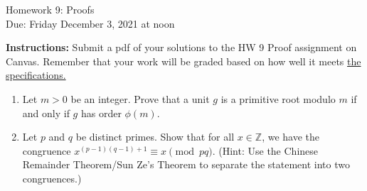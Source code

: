 \documentclass[10pt,a4paper]{article}
\begin{document}
\begin{center}
{\Large Homework 9: Proofs}\\
Due: Friday December 3, 2021 at noon\\


\end{center}
{\bf Instructions:} Submit a pdf of your solutions to the HW 9 Proof assignment on Canvas. Remember that your work will be graded based on how well it meets \href{https://docs.google.com/document/d/1emM06_WRh_h941rsjtRE9fRVndJtfRKd9gyS3Fs_rFA/edit?usp=sharing}{the specifications. }

\begin{enumerate}
\item Let $m>0$ be an integer. Prove that a unit $g$ is a primitive root modulo $m$ if and only if $g$ has order $\phi(m)$. 
\item Let $p$ and $q$ be distinct primes.  Show that for all $x \in \mathbb{Z}$, we have the congruence $x^{(p-1)(q-1)+1} \equiv x \pmod{pq}$.   (Hint: Use the Chinese Remainder Theorem/Sun Ze's Theorem to separate the statement into two congruences.)

\end{enumerate}
\end{document}
